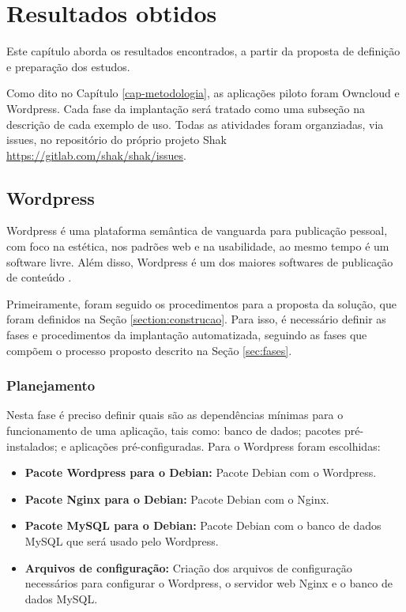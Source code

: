 \chapter{Resultados obtidos}
\label{cap-resultados}
Este capítulo aborda os resultados encontrados, a partir da proposta de
definição e preparação dos estudos. 

Como dito no Capítulo \ref{cap-metodologia}, as aplicações piloto foram Owncloud e Wordpress. 
Cada fase da implantação será tratado como uma 
subseção na descrição de cada exemplo de uso. Todas as atividades foram organziadas,
via issues, no repositório do próprio projeto Shak 
\url{https://gitlab.com/shak/shak/issues}.

\section{Wordpress}
\label{sub:wordpress}

Wordpress é uma plataforma semântica de vanguarda para publicação pessoal, 
com foco na estética, nos padrões web e na usabilidade, ao mesmo tempo é 
um software livre. Além disso, Wordpress é um dos maiores softwares de 
publicação de conteúdo \cite{wordpress}. 

Primeiramente, foram seguido os procedimentos para a proposta da solução, que foram
 definidos na Seção \ref{section:construcao}. Para isso, é
necessário definir as fases e procedimentos da implantação automatizada,
seguindo as fases que compõem o processo proposto descrito na Seção \ref{sec:fases}.

\subsection{Planejamento}

Nesta fase é preciso definir quais são as dependências mínimas
para o funcionamento de uma aplicação, tais como: banco de dados; pacotes
pré-instalados; e aplicações pré-configuradas. Para o Wordpress foram escolhidas:

\begin{itemize}
   \item \textbf{Pacote Wordpress para o Debian:} Pacote Debian com o Wordpress.
   \item \textbf{Pacote Nginx para o Debian:} Pacote Debian com o Nginx.
   \item \textbf{Pacote MySQL para o Debian:} Pacote Debian com o banco de dados MySQL
   que será usado pelo Wordpress.
   \item \textbf{Arquivos de configuração:} Criação dos arquivos de configuração
   necessários para configurar o Wordpress, o servidor web Nginx e o banco de dados
   MySQL.
\end{itemize}


